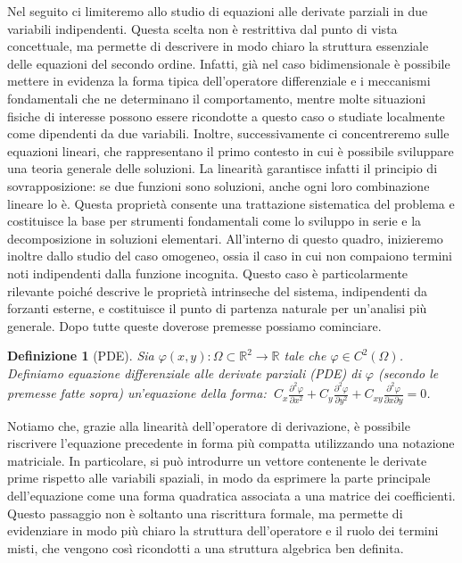 \documentclass[a4paper,12pt]{report}
\newtheorem{definizione}{Definizione}[chapter]
\newcommand{\pdd}[2]{\frac{\partial^2 #1}{\partial #2^2}}
\newcommand{\pdm}[3]{\frac{\partial^2 #1}{\partial #2 \partial #3}}
\begin{document}
Nel seguito ci limiteremo allo studio di equazioni alle derivate parziali in due variabili indipendenti. Questa scelta non è restrittiva dal punto di vista concettuale, ma permette di descrivere in modo chiaro la struttura essenziale delle equazioni del secondo ordine. Infatti, già nel caso bidimensionale è possibile mettere in evidenza la forma tipica dell’operatore differenziale e i meccanismi fondamentali che ne determinano il comportamento, mentre molte situazioni fisiche di interesse possono essere ricondotte a questo caso o studiate localmente come dipendenti da due variabili. Inoltre, successivamente ci concentreremo sulle equazioni lineari, che rappresentano il primo contesto in cui è possibile sviluppare una teoria generale delle soluzioni. La linearità garantisce infatti il principio di sovrapposizione: se due funzioni sono soluzioni, anche ogni loro combinazione lineare lo è. Questa proprietà consente una trattazione sistematica del problema e costituisce la base per strumenti fondamentali come lo sviluppo in serie e la decomposizione in soluzioni elementari. All’interno di questo quadro, inizieremo inoltre dallo studio del caso omogeneo, ossia il caso in cui non compaiono termini noti indipendenti dalla funzione incognita. Questo caso è particolarmente rilevante poiché descrive le proprietà intrinseche del sistema, indipendenti da forzanti esterne, e costituisce il punto di partenza naturale per un'analisi più generale. Dopo tutte queste doverose premesse possiamo cominciare.
\vspace{0.5cm}
\begin{definizione}[PDE]\label{def: 4.1}
    Sia $\varphi(x,y) :\Omega\subset\mathbb{R}^2\to \mathbb{R}$ tale che $\varphi\in C^2(\Omega)$. Definiamo equazione differenziale alle derivate parziali (PDE) di $\varphi$ (secondo le premesse fatte sopra) un'equazione della forma: $\ \displaystyle C_x\pdd{\varphi}{x}+C_y\pdd{\varphi}{y} +C_{xy}\pdm{\varphi}{x}{y}=0$. 
\end{definizione}
\vspace{0.5cm}
Notiamo che, grazie alla linearità dell’operatore di derivazione, è possibile riscrivere l’equazione precedente in forma più compatta utilizzando una notazione matriciale. In particolare, si può introdurre un vettore contenente le derivate prime rispetto alle variabili spaziali, in modo da esprimere la parte principale dell’equazione come una forma quadratica associata a una matrice dei coefficienti. Questo passaggio non è soltanto una riscrittura formale, ma permette di evidenziare in modo più chiaro la struttura dell’operatore e il ruolo dei termini misti, che vengono così ricondotti a una struttura algebrica ben definita.
\end{document}
